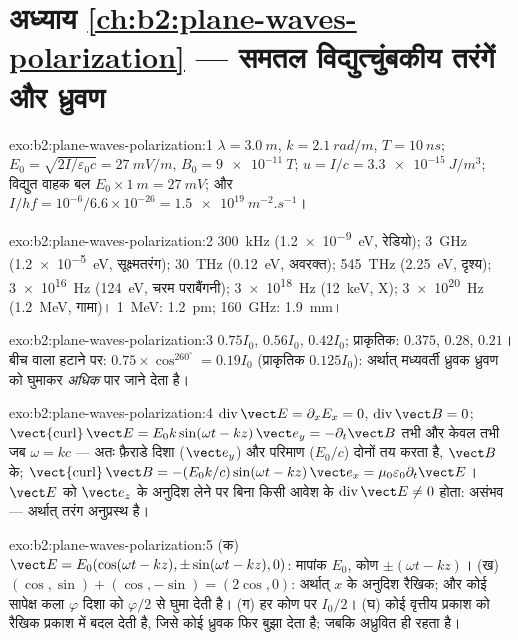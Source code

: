 \section*{अध्याय \ref{ch:b2:plane-waves-polarization} --- समतल विद्युत्चुंबकीय तरंगें और ध्रुवण}

\begin{solution}{exo:b2:plane-waves-polarization:1}
$\lambda = \qty{3.0}{m}$, $k = \qty{2.1}{rad/m}$, $T = \qty{10}{ns}$; $E_0 = \sqrt{2I/\varepsilon_0c}
= \qty{27}{mV/m}$, $B_0 = \qty{9e-11}{T}$; $u = I/c = \qty{3.3e-15}{J/m^3}$; विद्युत वाहक बल
$E_0 \times \qty{1}{m} = \qty{27}{mV}$; और $I/hf = 10^{-6}/6.6 \times 10^{-26} = \qty{1.5e19}{m^{-2}.s^{-1}}$।
\end{solution}

\begin{solution}{exo:b2:plane-waves-polarization:2}
\qty{300}{kHz} (\qty{1.2e-9}{eV}, रेडियो); \qty{3}{GHz} (\qty{1.2e-5}{eV}, सूक्ष्मतरंग);
\qty{30}{THz} (\qty{0.12}{eV}, अवरक्त); \qty{545}{THz} (\qty{2.25}{eV}, दृश्य);
\qty{3e16}{Hz} (\qty{124}{eV}, चरम पराबैंगनी); \qty{3e18}{Hz} (\qty{12}{keV}, X);
\qty{3e20}{Hz} (\qty{1.2}{MeV}, गामा)। \qty{1}{MeV}: \qty{1.2}{pm}; \qty{160}{GHz}: \qty{1.9}{mm}।
\end{solution}

\begin{solution}{exo:b2:plane-waves-polarization:3}
$0.75I_0$, $0.56I_0$, $0.42I_0$; प्राकृतिक: $0.375$, $0.28$, $0.21$। बीच वाला
हटाने पर: $0.75 \times \cos^260^\circ = 0.19I_0$ (प्राकृतिक $0.125I_0$): अर्थात्
मध्यवर्ती ध्रुवक ध्रुवण को घुमाकर \emph{अधिक} पार जाने देता है।
\end{solution}

\begin{solution}{exo:b2:plane-waves-polarization:4}
$\operatorname{div}\vect E = \partial_xE_x = 0$, $\operatorname{div}\vect B = 0$;
$\operatorname{\vect{curl}}\vect E = E_0k\sin(\omega t - kz)\,\vect e_y = -\partial_t\vect B$ तभी और केवल तभी जब $\omega =
kc$ --- अतः फ़ैराडे दिशा ($\vect e_y$) और परिमाण
($E_0/c$) दोनों तय करता है, $\vect B$ के; $\operatorname{\vect{curl}}\vect B = -(E_0k/c)\sin(\omega t - kz)\,\vect e_x
= \mu_0\varepsilon_0\partial_t\vect E$। $\vect E$ को $\vect e_z$ के अनुदिश लेने पर बिना किसी आवेश के $\operatorname{div}
\vect E \ne 0$ होता: असंभव --- अर्थात् तरंग अनुप्रस्थ है।
\end{solution}

\begin{solution}{exo:b2:plane-waves-polarization:5}
(क) $\vect E = E_0(\cos(\omega t - kz), \pm\sin(\omega t - kz), 0)$: मापांक $E_0$,
कोण $\pm(\omega t - kz)$। (ख) $(\cos, \sin) + (\cos, -\sin) = (2\cos, 0)$: अर्थात् $x$ के
अनुदिश रैखिक; और कोई सापेक्ष कला $\varphi$ दिशा को $\varphi/2$ से घुमा देती है। (ग)
हर कोण पर $I_0/2$। (घ) कोई  वृत्तीय प्रकाश को
रैखिक प्रकाश में बदल देती है, जिसे कोई ध्रुवक फिर बुझा देता है; जबकि 
अध्रुवित ही रहता है।
\end{solution}

